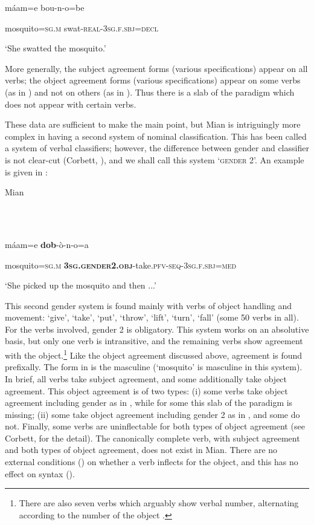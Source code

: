 \documentclass[output=paper]{langscibook}
\begin{document}
          máam=e  bou-n-o=be

  mosquito=\textsc{sg.m}  swat-\textsc{real-3sg.f.sbj=decl}

  ‘She swatted the mosquito.’

More generally, the subject agreement forms (various specifications) appear on all verbs; the object agreement forms (various specifications) appear on some verbs (as in ) and not on others (as in ). Thus there is a slab of the paradigm which does not appear with certain verbs.

These data are sufficient to make the main point, but Mian is intriguingly more complex in having a second system of nominal classification. This has been called a system of verbal classifiers; however, the difference between gender and classifier is not clear-cut (Corbett, \citealt{FeddenFinkel2017}), and we shall call this system ‘\textsc{gender} \textsc{2}’. An example is given in :

Mian \citep[288]{Fedden2022}

\ea%
    \label{ex:key:11}
    \gll \\
         \\
    \glt
    \z %

         máam=e  \textbf{dob}{}-ò-n-o=a

  mosquito=\textsc{sg.m}  \textbf{\textsc{3sg.gender2.obj}}{}-take.\textsc{pfv-seq-3sg.f.sbj=med}

  ‘She picked up the mosquito and then ...’

This second gender system is found mainly with verbs of object handling and movement: ‘give’, ‘take’, ‘put’, ‘throw’, ‘lift’, ‘turn’, ‘fall’ (some 50 verbs in all). For the verbs involved, gender 2 is obligatory. This system works on an absolutive basis, but only one verb is intransitive, and the remaining verbs show agreement with the object.\footnote{\textrm{There are also seven verbs which arguably show verbal number, alternating according to the number of the object \citep[311-314]{Fedden2019}.}} Like the object agreement discussed above, agreement is found prefixally. The form in  is the masculine (‘mosquito’ is masculine in this system). In brief, all verbs take subject agreement, and some additionally take object agreement. This object agreement is of two types: (i) some verbs take object agreement including gender as in , while for some this slab of the paradigm is missing; (ii) some take object agreement including gender 2 as in , and some do not. Finally, some verbs are uninflectable for both types of object agreement (see Corbett, \citealt{FeddenFinkel2017} for the detail). The canonically complete verb, with subject agreement and both types of object agreement, does not exist in Mian. There are no external conditions () on whether a verb inflects for the object, and this has no effect on syntax (). 
\end{document}
